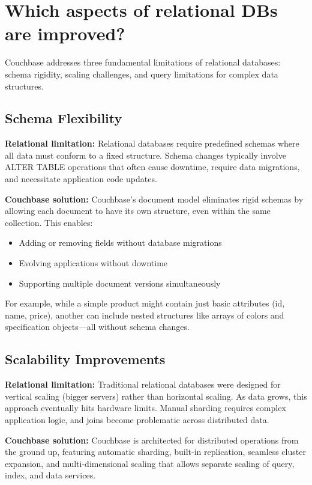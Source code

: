 \chapter{Which aspects of relational DBs are improved?}

Couchbase addresses three fundamental limitations of relational databases: schema rigidity, scaling challenges, and query limitations for complex data structures.

\section{Schema Flexibility}

\textbf{Relational limitation:} Relational databases require predefined schemas where all data must conform to a fixed structure. Schema changes typically involve ALTER TABLE operations that often cause downtime, require data migrations, and necessitate application code updates.

\textbf{Couchbase solution:} Couchbase's document model eliminates rigid schemas by allowing each document to have its own structure, even within the same collection. This enables:
\begin{itemize}
  \item Adding or removing fields without database migrations
  \item Evolving applications without downtime
  \item Supporting multiple document versions simultaneously
\end{itemize}

For example, while a simple product might contain just basic attributes (id, name, price), another can include nested structures like arrays of colors and specification objects—all without schema changes.

\section{Scalability Improvements}

\textbf{Relational limitation:} Traditional relational databases were designed for vertical scaling (bigger servers) rather than horizontal scaling. As data grows, this approach eventually hits hardware limits. Manual sharding requires complex application logic, and joins become problematic across distributed data.

\textbf{Couchbase solution:} Couchbase is architected for distributed operations from the ground up, featuring automatic sharding, built-in replication, seamless cluster expansion, and multi-dimensional scaling that allows separate scaling of query, index, and data services.

